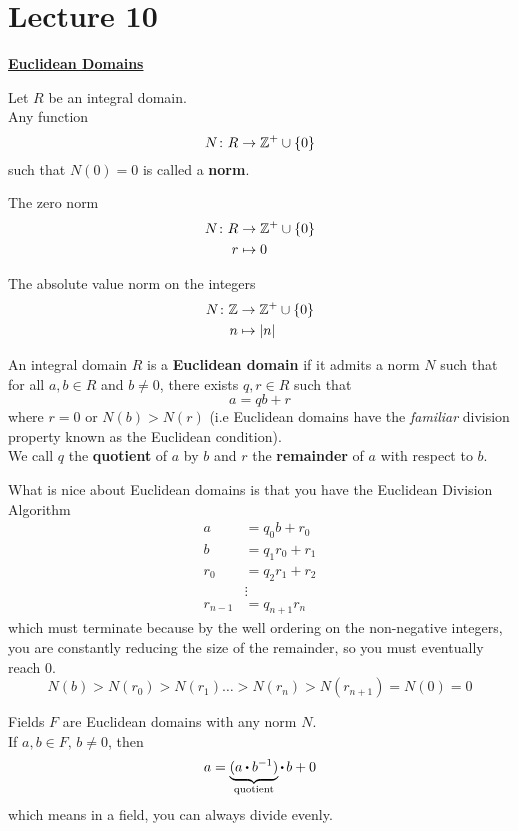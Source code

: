 \documentclass[../Main.tex]{subfiles}
\begin{document}
\chapter{Lecture 10}
\underline{\textbf{\Large Euclidean Domains}}
\begin{dfn}[title = Norm]
	Let $R$ be an integral domain.\\
	Any function
	\[N\colon R\to \mathbb{Z}^+\cup \{0\}\]
	such that $N(0)=0$ is called a \textbf{norm}.
\end{dfn}
\begin{example}
	The zero norm
	\begin{align*}
		N\colon R&\to \mathbb{Z}^+\cup \{0\} \\
		r&\mapsto 0
	\end{align*}
\end{example}
\begin{example}
	The absolute value norm on the integers
	\begin{align*}
	N\colon \mathbb{Z}&\to \mathbb{Z}^+\cup \{0\} \\
	n&\mapsto |n|
	\end{align*}
\end{example}
\begin{dfn}[title = {Euclidean Domain, Quotient, Remainder}]
	An integral domain $R$ is a \textbf{Euclidean domain} if it admits a norm $N$ such that for all $a,b\in R$ and $b\ne 0$, there exists $q,r\in R$ such that
	\[a=qb+r\]
	where $r=0$ or $N(b)>N(r)$ (i.e Euclidean domains have the \textit{familiar} division property known as the Euclidean condition).\\
	We call $q$ the \textbf{quotient} of $a$ by $b$ and $r$ the \textbf{remainder} of $a$ with respect to $b$.
\end{dfn}
What is nice about Euclidean domains is that you have the Euclidean Division Algorithm
\begin{align*}
a&=q_0b+r_0\\
b&=q_1r_0+r_1\\
r_0&=q_2r_1+r_2\\
&\vdots\\
r_{n-1}&=q_{n+1}r_n
\end{align*}
which must terminate because by the well ordering on the non-negative integers, you are constantly reducing the size of the remainder, so you must eventually reach $0$.
\[N(b)>N(r_0)>N(r_1)\dots >N(r_n)> N(r_{n+1})=N(0)=0 \]
\newpage
\begin{example}
	Fields $F$ are Euclidean domains with any norm $N$.\\
	If $a,b\in F, \, b\ne0$, then
	\[a=\underbrace{(a\rdot b^{-1})}_{\text{quotient}}\rdot\, b+ 0 \]
	which means in a field, you can always divide evenly.
\end{example}
\end{document}
